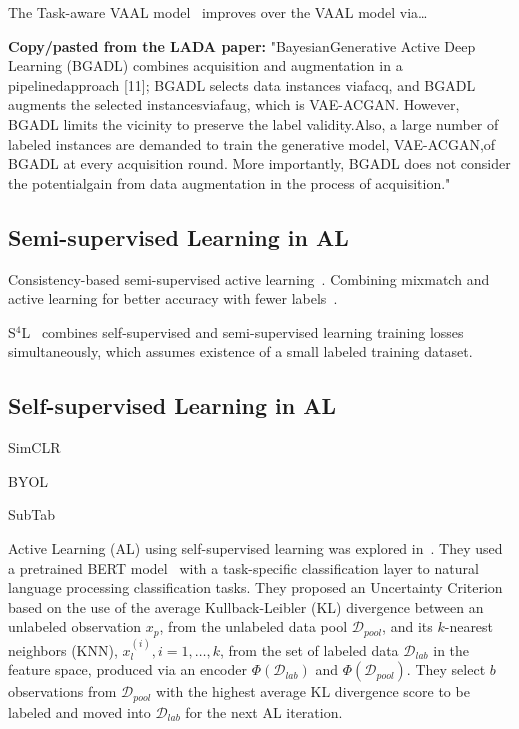 \documentclass{article}
\begin{document}
The Task-aware VAAL model~\cite{kim2021task} improves over the VAAL model
via\ldots

{\bf Copy/pasted from the LADA paper:} "BayesianGenerative Active Deep Learning
(BGADL) combines acquisition and augmentation in a pipelinedapproach [11];
BGADL selects data instances viafacq, and BGADL augments the selected
instancesviafaug, which is VAE-ACGAN.  However, BGADL limits the vicinity to
preserve the label validity.Also, a large number of labeled instances are
demanded to train the generative model, VAE-ACGAN,of BGADL at every
acquisition round. More importantly, BGADL does not consider the potentialgain
from data augmentation in the process of acquisition."

\subsection{Semi-supervised Learning in AL}

Consistency-based semi-supervised active learning~\cite{gao2020consistency}.
Combining mixmatch and active learning for better accuracy with fewer
labels~\cite{song2019combining}.

S$^4$L~\cite{zhai2019s4l} combines self-supervised and semi-supervised
learning training losses simultaneously, which assumes existence of a small
labeled training dataset.

\subsection{Self-supervised Learning in AL}

SimCLR~\cite{chen2020simple}

BYOL~\cite{grill2020bootstrap}

SubTab~\cite{ucar2021subtab}

Active Learning (AL) using self-supervised learning was explored
in~\cite{margatina2021active}. They used a pretrained BERT
model~\cite{devlin2019bert} with a task-specific classification layer to
natural language processing classification tasks. They proposed an Uncertainty
Criterion based on the use of the average Kullback-Leibler (KL) divergence
between an unlabeled observation $x_p$, from the unlabeled data pool
$\mathcal{D}_{pool}$, and its $k$-nearest neighbors (KNN), ${x_l^{(i)}},
i=1,\ldots,k$, from the set of labeled data $\mathcal{D}_{lab}$ in the feature
space, produced via an encoder $\Phi(\mathcal{D}_{lab})$ and
$\Phi(\mathcal{D}_{pool})$. They select $b$ observations from
$\mathcal{D}_{pool}$ with the highest average KL divergence score to be
labeled and moved into $\mathcal{D}_{lab}$ for the next AL iteration.
\end{document}
